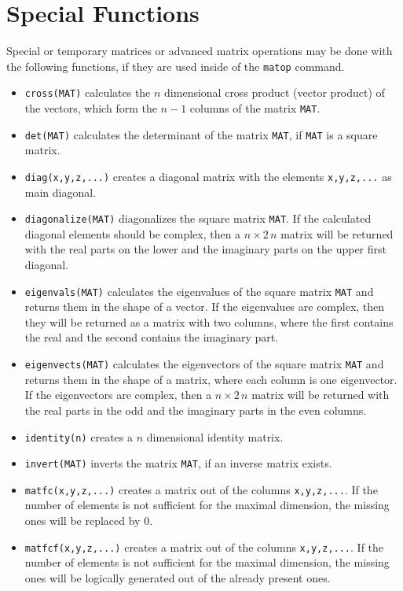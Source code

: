 \documentclass[DIV=14,headsepline,footsepline]{scrbook}
\begin{document}
			\section{Special Functions}
				Special or temporary matrices or advanced matrix operations may be done with the following functions, if they are used inside of the \lstinline+matop+ command.
				\begin{itemize}
					\item \lstinline+cross(MAT)+ calculates the $n$ dimensional cross product (vector product) of the vectors, which form the $n-1$ columns of the matrix \lstinline+MAT+.
					\item \lstinline+det(MAT)+ calculates the determinant of the matrix \lstinline+MAT+, if \lstinline+MAT+ is a square matrix.
					\item \lstinline+diag(x,y,z,...)+ creates a diagonal matrix with the elements \lstinline+x,y,z,...+ as main diagonal.
					\item \lstinline+diagonalize(MAT)+ diagonalizes the square matrix \lstinline+MAT+. If the calculated diagonal elements should be complex, then a $n \times 2\,n$ matrix will be returned with the real parts on the lower and the imaginary parts on the upper first diagonal.
					\item \lstinline+eigenvals(MAT)+ calculates the eigenvalues of the square matrix \lstinline+MAT+ and returns them in the shape of a vector. If the eigenvalues are complex, then they will be returned as a matrix with two columns, where the first contains the real and the second contains the imaginary part.
					\item \lstinline+eigenvects(MAT)+ calculates the eigenvectors of the square matrix \lstinline+MAT+ and returns them in the shape of a matrix, where each column is one eigenvector. If the eigenvectors are complex, then a $n \times 2\,n$ matrix will be returned with the real parts in the odd and the imaginary parts in the even columns.
					\item \lstinline+identity(n)+ creates a $n$ dimensional identity matrix.
					\item \lstinline+invert(MAT)+ inverts the matrix \lstinline+MAT+, if an inverse matrix exists.
					\item \lstinline+matfc(x,y,z,...)+ creates a matrix out of the columns \lstinline+x,y,z,...+. If the number of elements is not sufficient for the maximal dimension, the missing ones will be replaced by 0.
					\item \lstinline+matfcf(x,y,z,...)+ creates a matrix out of the columns \lstinline+x,y,z,...+. If the number of elements is not sufficient for the maximal dimension, the missing ones will be logically generated out of the already present ones.

\end{itemize}
\end{document}
